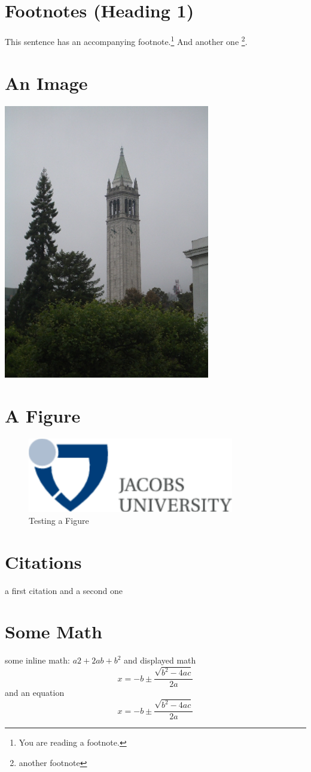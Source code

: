 \documentclass{article}
\begin{document}
\section{Footnotes (Heading 1)}

This sentence has an accompanying footnote.\footnote{You are reading a footnote.}   And
another one \footnote{another footnote}. 

\section{An Image}
 \includegraphics[width=9cm]{campanile_fog}

\section{A Figure}

\begin{figure}[ht]
  \includegraphics[width=9cm]{logo}
  \caption{Testing a Figure}
\end{figure}

\section{Citations}
a first citation \cite{aaa} and a second one \cite{bbb}

\section{Some Math}
some inline math: $a2+2ab+b^2$ and displayed math
\[ x = -b\pm \frac{\sqrt{b^2-4ac}}{2a}\]
and an equation
\begin{equation}\label{foo}
  x = -b\pm \frac{\sqrt{b^2-4ac}}{2a}
\end{equation}



\end{document}
